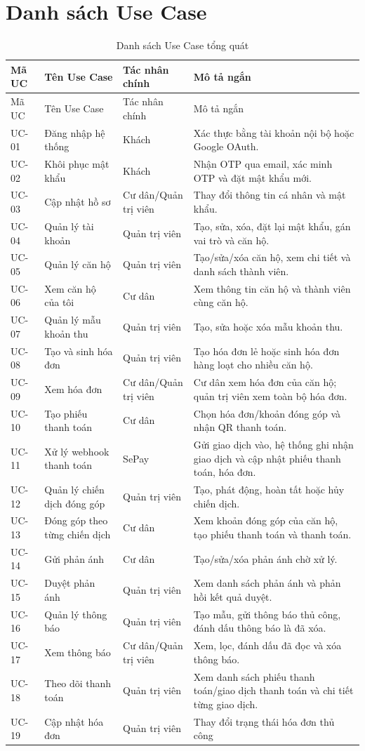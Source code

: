 ﻿\documentclass[12pt,a4paper]{report}
\begin{document}
\section{Danh sách Use Case}
\begin{longtable}{L{1.6cm} L{4.1cm} L{3cm} L{5.3cm}}
\caption{Danh sách Use Case tổng quát}\label{tab:usecases}\\
\toprule
Mã UC & Tên Use Case & Tác nhân chính & Mô tả ngắn \\
\midrule
\endfirsthead
\toprule
Mã UC & Tên Use Case & Tác nhân chính & Mô tả ngắn \\
\midrule
\endhead
UC-01 & Đăng nhập hệ thống & Khách & Xác thực bằng tài khoản nội bộ hoặc Google OAuth. \\
UC-02 & Khôi phục mật khẩu & Khách & Nhận OTP qua email, xác minh OTP và đặt mật khẩu mới. \\
UC-03 & Cập nhật hồ sơ & Cư dân/Quản trị viên & Thay đổi thông tin cá nhân và mật khẩu. \\
UC-04 & Quản lý tài khoản & Quản trị viên & Tạo, sửa, xóa, đặt lại mật khẩu, gán vai trò và căn hộ. \\
UC-05 & Quản lý căn hộ & Quản trị viên & Tạo/sửa/xóa căn hộ, xem chi tiết và danh sách thành viên. \\
UC-06 & Xem căn hộ của tôi & Cư dân & Xem thông tin căn hộ và thành viên cùng căn hộ. \\
UC-07 & Quản lý mẫu khoản thu & Quản trị viên & Tạo, sửa hoặc xóa mẫu khoản thu. \\
UC-08 & Tạo và sinh hóa đơn & Quản trị viên & Tạo hóa đơn lẻ hoặc sinh hóa đơn hàng loạt cho nhiều căn hộ. \\
UC-09 & Xem hóa đơn & Cư dân/Quản trị viên & Cư dân xem hóa đơn của căn hộ; quản trị viên xem toàn bộ hóa đơn. \\
UC-10 & Tạo phiếu thanh toán & Cư dân & Chọn hóa đơn/khoản đóng góp và nhận QR thanh toán. \\
UC-11 & Xử lý webhook thanh toán & SePay & Gửi giao dịch vào, hệ thống ghi nhận giao dịch và cập nhật phiếu thanh toán, hóa đơn. \\
UC-12 & Quản lý chiến dịch đóng góp & Quản trị viên & Tạo, phát động, hoàn tất hoặc hủy chiến dịch. \\
UC-13 & Đóng góp theo từng chiến dịch & Cư dân & Xem khoản đóng góp của căn hộ, tạo phiếu thanh toán và thanh toán. \\
UC-14 & Gửi phản ánh & Cư dân & Tạo/sửa/xóa phản ánh chờ xử lý. \\
UC-15 & Duyệt phản ánh & Quản trị viên & Xem danh sách phản ánh và phản hồi kết quả duyệt. \\
UC-16 & Quản lý thông báo & Quản trị viên & Tạo mẫu, gửi thông báo thủ công, đánh dấu thông báo là đã xóa. \\
UC-17 & Xem thông báo & Cư dân/Quản trị viên & Xem, lọc, đánh dấu đã đọc và xóa thông báo. \\
UC-18 & Theo dõi thanh toán & Quản trị viên & Xem danh sách phiếu thanh toán/giao dịch thanh toán và chi tiết từng giao dịch. \\
UC-19 & Cập nhật hóa đơn & Quản trị viên & Thay đổi trạng thái hóa đơn thủ công \\
\bottomrule
\end{longtable}
\end{document}
